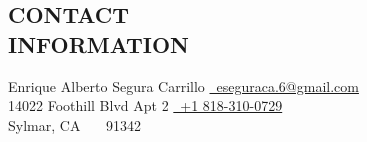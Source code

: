 \documentclass[margin,line]{res}
\let\origsection\section%
\let\section\subsection%
\let\section\origsection%
\begin{document}
\nocite{*}


\begin{resume}

\section{ \mysidestyle  CONTACT \\ INFORMATION}

Enrique Alberto Segura Carrillo                \hfill \href{mailto:eseguraca.6@gmail.com}{~eseguraca.6@gmail.com}
\vspace{0mm}\\\vspace{0mm}%
14022 Foothill Blvd Apt 2  \hfill \href{tel:8183100729}{~+1 818-310-0729}%
\vspace{0mm}\\\vspace{0mm}%
Sylmar, CA \ \ \ 91342\hfill %



%


\end{resume}
\end{document}
